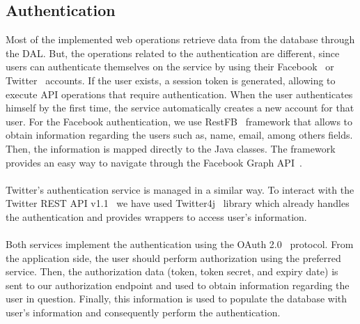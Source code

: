 \subsection{Authentication}
\label{subsec:authentication}
Most of the implemented web operations retrieve data from the database through the DAL. But, the operations related to the authentication are different, since users can authenticate themselves on the service by using their Facebook~\cite{facebook} or Twitter~\cite{twitter} accounts. If the user exists, a session token is generated, allowing to execute API operations that require authentication. When the user authenticates himself by the first time, the service automatically creates a new account for that user. For the Facebook authentication, we use RestFB~\cite{restfb} framework that allows to obtain information regarding the users such as, name, email, among others fields. Then, the information is mapped directly to the Java classes. The framework provides an easy way to navigate through the Facebook Graph API~\cite{facebookGraphAPI}.\\
\\
Twitter's authentication service is managed in a similar way. To interact with the Twitter REST API v1.1~\cite{twitterRestAPI} we have used Twitter4j~\cite{twitter4j} library which already handles the authentication and provides wrappers to access user's information.\\
\\
Both services implement the authentication using the OAuth 2.0~\cite{oauth2} protocol. From the application side, the user should perform authorization using the preferred service. Then, the authorization data (token, token secret, and expiry date) is sent to our authorization endpoint and used to obtain information regarding the user in question. Finally, this information is used to populate the database with user's information and consequently perform the authentication.
